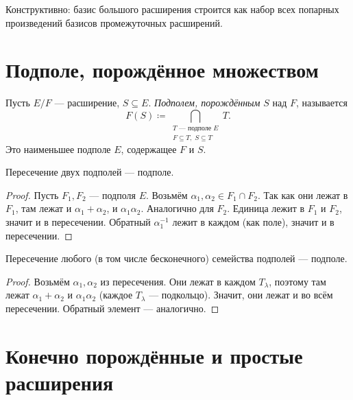 \begin{remark}
    Конструктивно: базис большого расширения строится как набор всех
    попарных произведений базисов промежуточных расширений.
\end{remark}

\section{Подполе, порождённое множеством}

\begin{definition}
    Пусть $E / F$ --- расширение, $S \subseteq E$. \emph{Подполем, порождённым} $S$ над $F$,
    называется
    \[
        F(S) \coloneqq \bigcap_{\substack{T \text{ --- подполе } E \\ F \subseteq T,\; S \subseteq T}} T.
    \]
    Это наименьшее подполе $E$, содержащее $F$ и $S$.
\end{definition}

\begin{stmt}
    Пересечение двух подполей --- подполе.

    \begin{proof}
        Пусть $F_1, F_2$ --- подполя $E$. Возьмём $\alpha_1, \alpha_2 \in F_1 \cap F_2$. Так как они
        лежат в $F_1$, там лежат и $\alpha_1 + \alpha_2$, и $\alpha_1 \alpha_2$. Аналогично для $F_2$.
        Единица лежит в $F_1$ и $F_2$, значит и в пересечении. Обратный $\alpha_1^{-1}$ лежит в каждом
        (как поле), значит и в пересечении.
    \end{proof}
\end{stmt}

\begin{stmt}
    Пересечение любого (в том числе бесконечного) семейства подполей --- подполе.

    \begin{proof}
        Возьмём $\alpha_1, \alpha_2$ из пересечения. Они лежат в каждом $T_\lambda$, поэтому там
        лежат $\alpha_1 + \alpha_2$ и $\alpha_1 \alpha_2$ (каждое $T_\lambda$ --- подкольцо). Значит,
        они лежат и во всём пересечении. Обратный элемент --- аналогично.
    \end{proof}
\end{stmt}

\section{Конечно порождённые и простые расширения}

